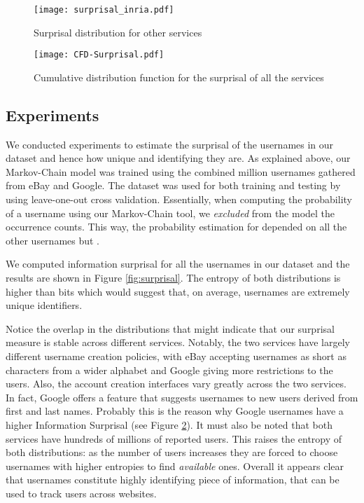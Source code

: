\documentclass[letterpaper]{sig-alternate}
\begin{document}
\begin{figure} [t] \centering
\texttt{[image: surprisal\_inria.pdf]}
\caption{Surprisal distribution for other services}
\label{fig:surprisal_inria}
\end{figure}

\begin{figure} [t] \centering
\texttt{[image: CFD-Surprisal.pdf]} \caption{Cumulative
distribution function for the surprisal of all the services}
\label{fig:cdf-surprisal} \end{figure}

\subsection{Experiments}


We conducted experiments to estimate the surprisal of the usernames in our
dataset and hence how unique and identifying they are.
As explained above, our Markov-Chain model was trained using the combined
 million usernames gathered from eBay and Google.
The dataset was used for both training and testing by using leave-one-out
cross validation. Essentially, when computing the probability of a username
 using our Markov-Chain tool, we {\em excluded}  from the model the
occurrence counts. This way, the probability
estimation for  depended on all the other usernames but . 

We computed information surprisal for all the usernames in our dataset and the results are
shown in Figure \ref{fig:surprisal}.
The entropy of both distributions is higher than  bits which would suggest that,
on average, usernames are extremely unique identifiers.

Notice the overlap in the distributions that might indicate that our surprisal measure
is stable across different services. Notably, the two services have largely different
username creation policies, with eBay accepting usernames as short as  characters from
a wider alphabet and Google giving more restrictions to the users.
Also, the account creation interfaces vary greatly across the two services. In fact, Google
offers a feature that suggests usernames to new users derived from first and last names.
Probably this is the reason why Google usernames have a higher Information Surprisal (see Figure \ref{fig:cdf-surprisal}).
It must also be noted that both services have hundreds of millions
of reported users. This raises the entropy of both distributions:
as the number of users increases they are forced to choose usernames with higher
entropies to find {\em available} ones. 
Overall it appears clear that usernames constitute highly identifying piece of
information, that can be used to track users across websites. 
\end{document}
